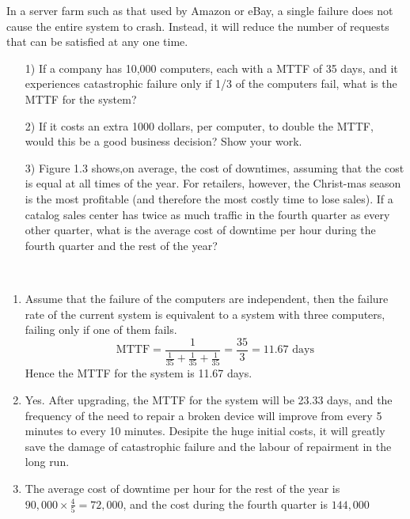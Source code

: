 

\begin{exercise}[]{In a server farm such as that used by Amazon or eBay, a single failure does not cause the entire system to crash. Instead, it will reduce the number of requests that can be satisfied at any one time.
  \begin{itemize}
    \item [1)]
     If a company has 10,000 computers, each with a MTTF of 35 days, and it experiences catastrophic failure only if 1/3 of the computers fail, what is the MTTF for the system?
    \item [2)]
     If it costs an extra 1000 dollars, per computer, to double the MTTF, would this be a good business decision? Show your work.
    \item [3)]
     Figure 1.3 shows,on average, the cost of downtimes, assuming that the cost is equal at all times of the year. For retailers, however, the Christ-mas season is the most profitable (and therefore the most costly time to lose sales). If a catalog sales center has twice as much traffic in the fourth quarter as every other quarter, what is the average cost of downtime per hour during the fourth quarter and the rest of the year?
  \end{itemize}}
  \begin{solution}
  \par{~}
  \begin{enumerate}
    \item {
      Assume that the failure of the computers are independent, then the failure rate of the current system is equivalent to a system with three computers, failing only if one of them fails.
      \begin{equation}
        \text{MTTF} = \frac{1}{\frac{1}{35} + \frac{1}{35} + \frac{1}{35}} = \frac{35}{3} = 11.67 \text{ days}
      \end{equation}
      Hence the MTTF for the system is 11.67 days.
    }
    \item {
      Yes. After upgrading, the MTTF for the system will be 23.33 days, and the frequency of the need to repair a broken device will improve from every 5 minutes to every 10 minutes. Desipite the huge initial costs, it will greatly save the damage of catastrophic failure and the labour of repairment in the long run.
    }
    \item {
      The average cost of downtime per hour for the rest of the year is $90,000 \times \frac{4}{5} = 72,000$, and the cost during the fourth quarter is $144,000$
    }
  \end{enumerate}
  \end{solution}
  \label{ex1}
\end{exercise}



